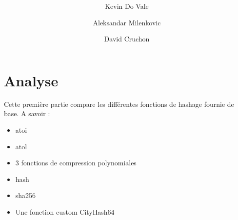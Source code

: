 \documentclass[11pt,a4paper]{article}
\author{Kevin Do Vale \and Aleksandar Milenkovic \and David Cruchon}
\title{{\normalsize \doccourse} \\ \doctitle }
\begin{document}
\maketitle
\vspace{1em}

\section{Analyse}
Cette première partie compare les différentes fonctions de hashage fournie de base. A savoir :
\begin{itemize}  
	\item atoi
	\item atol
	\item 3 fonctions de compression polynomiales
	\item hash
	\item sha256
	\item Une fonction custom CityHash64
\end{itemize}



\end{document}
